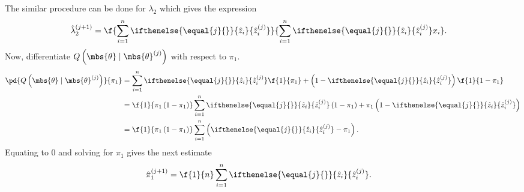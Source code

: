 \documentclass{tufte-handout}
\newcommand{\zhat}[2][{}]{\ifthenelse{\equal{#1}{}}{\hat{z}_{#2}}{\hat{z}_{#2}^{(#1)}}}
\begin{document}
    The similar procedure can be done for $\lambda_{2}$ which gives the expression
    \begin{align}
        \hat{\lambda}_{2}^{(j+1)} 
        &= 
        \f{
            \sum_{i=1}^{n} \zhat[j]{i}
        }{
            \sum_{i=1}^{n}\zhat[j]{i} x_{i}  
        }.
    \end{align}
    Now, differentiate $Q\left(\mbs{\theta}\mid\mbs{\theta}^{(j)}\right)$ with respect to $\pi_{1}$.
    \begin{align}
        \pd{
            Q\left( \mbs{\theta}\mid\mbs{\theta}^{(j)} \right)
        }{
            \pi_{1}
        }
        &=
        \sum_{i=1}^{n}\zhat[j]{i}\f{1}{\pi_{1}} + \left(1-\zhat[j]{i}\right)\f{1}{ 1-\pi_{1}}\\
        &=
        \f{1}{\pi_{1}\left( 1-\pi_{1} \right)}\sum_{i=1}^{n}\zhat[j]{i}\left( 1-\pi_{1} \right)+ \pi_{1}\left(1-\zhat[j]{i}\right)\\
        &=
        \f{1}{\pi_{1}\left( 1-\pi_{1} \right)}\sum_{i=1}^{n}\left(\zhat[j]{i} - \pi_{1}\right).
    \end{align}
    Equating to $0$ and solving for $\pi_{1}$ gives the next estimate
    \begin{align}
        \hat{\pi}_{1}^{(j+1)} &= \f{1}{n}\sum_{i=1}^{n}\zhat[j]{i}.
    \end{align}

    
    
\end{document}
